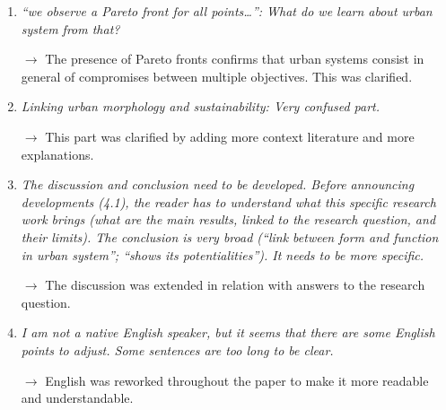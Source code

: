 \documentclass[11pt,a4paper,sans]{moderncv}        %
\begin{document}
\begin{enumerate}
\medskip

\item \textit{``we observe a Pareto front for all points\ldots'': What do we learn about urban system from that?}

$\rightarrow$ The presence of Pareto fronts confirms that urban systems consist in general of compromises between multiple objectives. This was clarified.

\medskip


\item \textit{Linking urban morphology and sustainability: Very confused part.}

$\rightarrow$ This part was clarified by adding more context literature and more explanations.


\medskip


\item \textit{The discussion and conclusion need to be developed. Before announcing developments (4.1), the reader has to understand what this specific research work brings (what are the main results, linked to the research question, and their limits). The conclusion is very broad (“link between form and function in urban system”; “shows its potentialities”). It needs to be more specific.}

$\rightarrow$ The discussion was extended in relation with answers to the research question.


\medskip

\item \textit{I am not a native English speaker, but it seems that there are some English points to adjust. Some sentences are too long to be clear.}
 
$\rightarrow$ English was reworked throughout the paper to make it more readable and understandable.

\end{enumerate}
\end{document}
